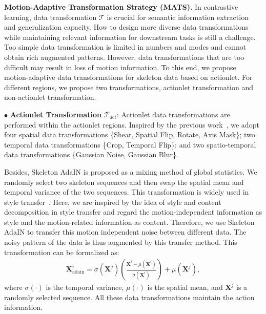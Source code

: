 \documentclass[twocolumn]{article}
\newcommand{\wh}[1]{\textcolor{black}{#1}}
\newcommand{\zjh}[1]{\textcolor{black}{#1}}
\begin{document}
\noindent\textbf{Motion-Adaptive Transformation Strategy (MATS).} 
\label{sec:mats}
In contrastive learning, data transformation $\mathcal{T}$ is crucial for semantic information extraction and generalization capacity. 
How to design more diverse data transformations while maintaining relevant information for downstream tasks is still a challenge.
Too simple data transformation is limited in numbers and modes and cannot obtain rich augmented patterns. However, data transformations that are too difficult may result in loss of motion information.
\zjh{To this end}, we propose motion-adaptive data transformations for skeleton data based on actionlet.
For different regions, we propose two transformations, actionlet transformation and non-actionlet transformation.

\vspace{1mm}

$\bullet$ \textbf{Actionlet Transformation $\mathcal{T}_{\text{act}}$}: 
Actionlet data transformations are performed within the actionlet regions. Inspired by the previous work~\cite{guo2021contrastive}, we adopt four spatial data transformations \{Shear, Spatial Flip, Rotate, Axis Mask\}; two temporal data transformations \{Crop, Temporal Flip\}; and two spatio-temporal data transformations \{Gaussian Noise, Gaussian Blur\}.

Besides, Skeleton AdaIN is proposed as a mixing method of global statistics. 
We randomly select two skeleton sequences and then swap the spatial mean and temporal variance of the two sequences. 
This transformation is widely used in style transfer~\cite{huang2017arbitrary}.
Here, we are inspired by the idea of style and content decomposition in style transfer and regard the motion-independent information as style and the motion-related information as content. Therefore, we use Skeleton AdaIN to transfer this motion independent noise between different data.
The noisy pattern of the data is thus augmented by this transfer method.
This transformation can be formalized as:
\begin{equation}
    \label{equ:info}
    \begin{aligned}
    \mathbf{X}^i_{\text{adain}} = \sigma(\mathbf{X}^j) \left(\frac{\mathbf{X}^i - \mu(\mathbf{X}^i)}{\sigma(\mathbf{X}^i)}\right) + \mu(\mathbf{X}^j),
    \end{aligned}
\end{equation}
where $\sigma(\cdot)$ is the temporal variance\wh{,} $\mu(\cdot)$ is the spatial mean, and $\mathbf{X}^j$ is a randomly selected sequence. All these data transformations maintain the action information.
\end{document}
